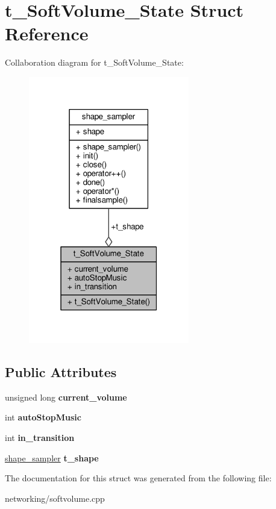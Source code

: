 \hypertarget{structt__SoftVolume__State}{}\section{t\+\_\+\+Soft\+Volume\+\_\+\+State Struct Reference}
\label{structt__SoftVolume__State}


Collaboration diagram for t\+\_\+\+Soft\+Volume\+\_\+\+State\+:
\nopagebreak
\begin{figure}[H]
\begin{center}
\leavevmode
\includegraphics[width=199pt]{d9/dda/structt__SoftVolume__State__coll__graph}
\end{center}
\end{figure}
\subsection*{Public Attributes}
\begin{DoxyCompactItemize}
\item 
unsigned long {\bfseries current\+\_\+volume}\hypertarget{structt__SoftVolume__State_a5a2f2514eb039298fba67ce80c751d1d}{}\label{structt__SoftVolume__State_a5a2f2514eb039298fba67ce80c751d1d}

\item 
int {\bfseries auto\+Stop\+Music}\hypertarget{structt__SoftVolume__State_aaf298493a7dec24816d492c85542ae44}{}\label{structt__SoftVolume__State_aaf298493a7dec24816d492c85542ae44}

\item 
int {\bfseries in\+\_\+transition}\hypertarget{structt__SoftVolume__State_a6f97d5cc1840e3ca7555c0b75582a832}{}\label{structt__SoftVolume__State_a6f97d5cc1840e3ca7555c0b75582a832}

\item 
\hyperlink{classshape__sampler}{shape\+\_\+sampler} {\bfseries t\+\_\+shape}\hypertarget{structt__SoftVolume__State_aee4a89e9eac14e0b8effab3843130868}{}\label{structt__SoftVolume__State_aee4a89e9eac14e0b8effab3843130868}

\end{DoxyCompactItemize}


The documentation for this struct was generated from the following file\+:\begin{DoxyCompactItemize}
\item 
networking/softvolume.\+cpp\end{DoxyCompactItemize}
